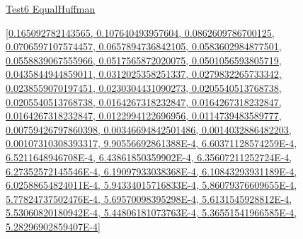 \documentclass[12pt]{article}
\begin{document}
\noindent \url{Test6 EqualHuffman}

\noindent \url{[0.165092782143565, 0.107640493957604, 0.0862609786700125, 0.0706597107574457, 0.0657894736842105, 0.0583602984877501, 0.0558839067555966, 0.0517565872020075, 0.0501056593805719, 0.0435844944859011, 0.0312025358251337, 0.0279832265733342, 0.0238559070197451, 0.0230304431090273, 0.0205540513768738, 0.0205540513768738, 0.0164267318232847, 0.0164267318232847, 0.0164267318232847, 0.0122994122696956, 0.0114739483589777, 0.00759426797860398, 0.00346694842501486, 0.0014032886482203, 0.00107310308393317, 9.90556692861388E-4, 6.60371128574259E-4, 6.5211648946708E-4, 6.43861850359902E-4, 6.35607211252724E-4, 6.27352572145546E-4, 6.19097933038368E-4, 6.10843293931189E-4, 6.02588654824011E-4, 5.94334015716833E-4, 5.86079376609655E-4, 5.77824737502476E-4, 5.69570098395298E-4, 5.6131545928812E-4, 5.53060820180942E-4, 5.44806181073763E-4, 5.36551541966585E-4, 5.28296902859407E-4]}
\end{document}
